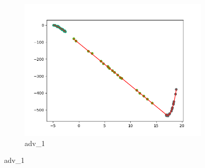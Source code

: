 \documentclass[notitlepage, 11pt]{report}
\begin{document}
\begin{figure}[H]
\begin{subfigure}{0.25\textwidth}
					\includegraphics[width=\linewidth]{Figure_9}
					\caption{adv\_1}
					\label{fig:9}
				\end{subfigure}
					

\end{figure}
\end{document}
